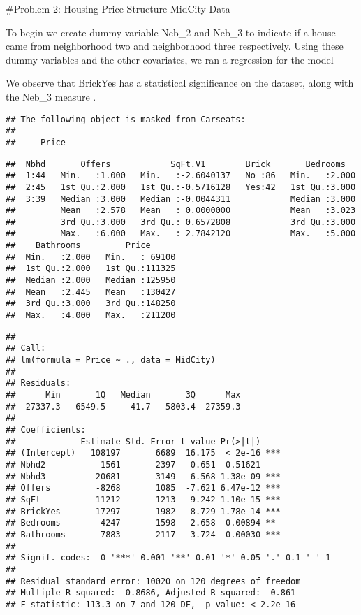 \documentclass[
]{article}
\begin{document}
\#Problem 2: Housing Price Structure MidCity Data

To begin we create dummy variable Neb\_2 and Neb\_3 to indicate if a
house came from neighborhood two and neighborhood three respectively.
Using these dummy variables and the other covariates, we ran a
regression for the model

We observe that BrickYes has a statistical significance on the dataset,
along with the Neb\_3 measure .

\begin{verbatim}
## The following object is masked from Carseats:
## 
##     Price
\end{verbatim}

\begin{verbatim}
##  Nbhd       Offers            SqFt.V1        Brick       Bedrooms    
##  1:44   Min.   :1.000   Min.   :-2.6040137   No :86   Min.   :2.000  
##  2:45   1st Qu.:2.000   1st Qu.:-0.5716128   Yes:42   1st Qu.:3.000  
##  3:39   Median :3.000   Median :-0.0044311            Median :3.000  
##         Mean   :2.578   Mean   : 0.0000000            Mean   :3.023  
##         3rd Qu.:3.000   3rd Qu.: 0.6572808            3rd Qu.:3.000  
##         Max.   :6.000   Max.   : 2.7842120            Max.   :5.000  
##    Bathrooms         Price       
##  Min.   :2.000   Min.   : 69100  
##  1st Qu.:2.000   1st Qu.:111325  
##  Median :2.000   Median :125950  
##  Mean   :2.445   Mean   :130427  
##  3rd Qu.:3.000   3rd Qu.:148250  
##  Max.   :4.000   Max.   :211200
\end{verbatim}

\begin{verbatim}
## 
## Call:
## lm(formula = Price ~ ., data = MidCity)
## 
## Residuals:
##      Min       1Q   Median       3Q      Max 
## -27337.3  -6549.5    -41.7   5803.4  27359.3 
## 
## Coefficients:
##             Estimate Std. Error t value Pr(>|t|)    
## (Intercept)   108197       6689  16.175  < 2e-16 ***
## Nbhd2          -1561       2397  -0.651  0.51621    
## Nbhd3          20681       3149   6.568 1.38e-09 ***
## Offers         -8268       1085  -7.621 6.47e-12 ***
## SqFt           11212       1213   9.242 1.10e-15 ***
## BrickYes       17297       1982   8.729 1.78e-14 ***
## Bedrooms        4247       1598   2.658  0.00894 ** 
## Bathrooms       7883       2117   3.724  0.00030 ***
## ---
## Signif. codes:  0 '***' 0.001 '**' 0.01 '*' 0.05 '.' 0.1 ' ' 1
## 
## Residual standard error: 10020 on 120 degrees of freedom
## Multiple R-squared:  0.8686, Adjusted R-squared:  0.861 
## F-statistic: 113.3 on 7 and 120 DF,  p-value: < 2.2e-16
\end{verbatim}
\end{document}
